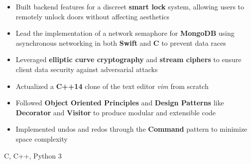 \documentclass[10pt,a4paper,ragged2e]{altacv}
\begin{document}
\begin{paracol}{2}
\divider

\begin{itemize}
    \item Built backend features for a discreet \textbf{smart lock} system,
        allowing users to remotely unlock doors without affecting aesthetics
    \item Lead the implementation of a network semaphore for \textbf{MongoDB} using asynchronous networking in both \textbf{Swift} and \textbf{C} to prevent data races
    \item Leveraged \textbf{elliptic curve cryptography} and \textbf{stream ciphers} to ensure client data security against adversarial attacks
\end{itemize}

\iffalse
\cvevent{Pleter}{}{May 2019}{\href{https://github.com/felix990302/word\_completion}{github.com/felix990302/word\_completion}}
\begin{itemize}
    \item Designed a concurrent auto-completion engine using a variation of \textbf{range trees} consisting of a \textbf{compressed trie} and sorted arrays in \textbf{C++}
    \item Accounted for race conditions and deadlocks using fine-grained read-write lock hierarchies
    \item Incorporated \textbf{gprof} as profiler for optimizations including a static \textbf{fixed-size allocator} to achieve \textbf{20x} speedup
\end{itemize}

\divider
\fi
{}
\begin{itemize}
    \item Actualized a \textbf{C++14} clone of the text editor \emph{vim} from scratch
    \item Followed \textbf{Object Oriented Principles} and \textbf{Design Patterns} like \textbf{Decorator} and \textbf{Visitor} to produce modular and extensible code
    \item Implemented undos and redos through the \textbf{Command} pattern to minimize space complexity
\end{itemize}

\switchcolumn

C, C++, Python 3


\end{paracol}
\end{document}
